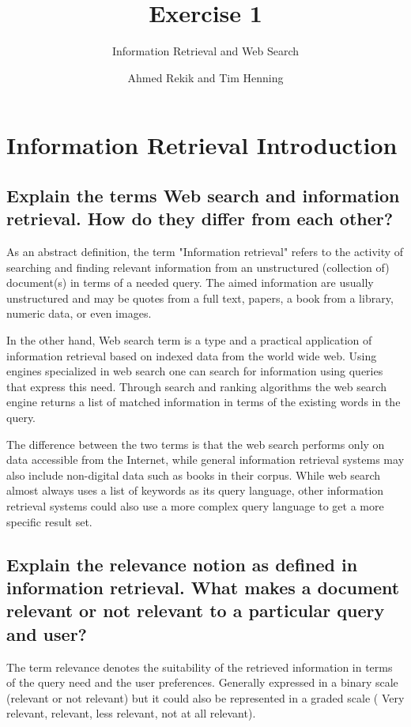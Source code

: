 \documentclass{scrartcl}
\title{Exercise 1}
\subtitle{Information Retrieval and Web Search}
\author{Ahmed Rekik and Tim Henning}
\begin{document}
\maketitle

\setcounter{section}{1}
\section{Information Retrieval Introduction}

\subsection{Explain the terms Web search and information retrieval. How do they differ from each
	other?}

As an abstract definition, the term  "Information retrieval" refers to the activity of searching and finding relevant information from an unstructured (collection of) document(s) in terms of a needed query. The aimed information are usually unstructured and may be quotes from a full text, papers, a book from a library, numeric data, or even images.

In the other hand, Web search term is a type and a practical application of information retrieval based on indexed data from the world wide web. Using engines specialized in web search one can search for information using queries that express this need. Through search and ranking algorithms the web search engine returns a list of matched information in terms of the existing words in the query.

The difference between the two terms is that the web search performs only on data accessible from the Internet, while general information retrieval systems may also include non-digital data such as books in their corpus. While web search almost always uses a list of keywords as its query language, other information retrieval systems could also use a more complex query language to get a more specific result set.

\subsection{Explain the relevance notion as defined in information retrieval. What makes a document
	relevant or not relevant to a particular query and user?}

The term relevance denotes the suitability of the retrieved information in terms of the query need and the user preferences. Generally expressed in a binary scale (relevant or not relevant) but it could also be represented in a graded scale ( Very relevant, relevant, less relevant, not at all relevant).
\end{document}
